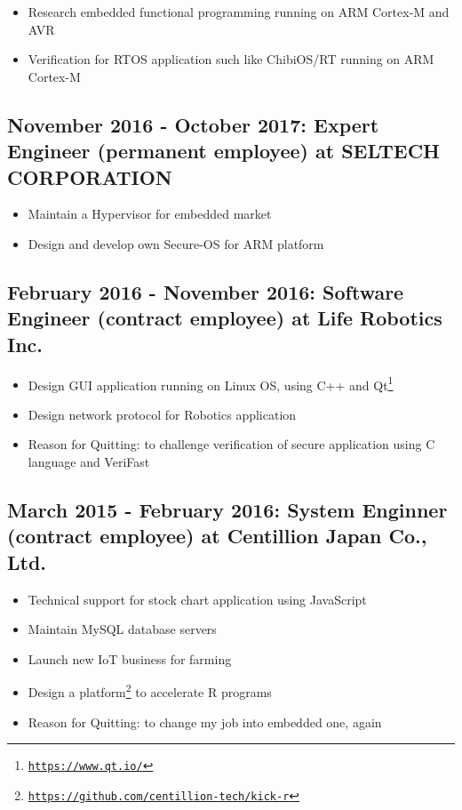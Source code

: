 \documentclass[letterpaper]{article}
\begin{document}
\begin{itemize}
  \item Research embedded functional programming running on ARM Cortex-M and AVR
  \item Verification for RTOS application such like ChibiOS/RT running on ARM Cortex-M
\end{itemize}

\subsection*{November 2016 - October 2017: Expert Engineer (permanent employee) at SELTECH CORPORATION}

\begin{itemize}
  \item Maintain a Hypervisor for embedded market
  \item Design and develop own Secure-OS for ARM platform
\end{itemize}

\subsection*{February 2016 - November 2016: Software Engineer (contract employee) at Life Robotics Inc.}

\begin{itemize}
  \item Design GUI application running on Linux OS, using C++ and Qt\footnote{\href{https://www.qt.io/}{\tt https://www.qt.io/}}
  \item Design network protocol for Robotics application
  \item Reason for Quitting: to challenge verification of secure application using C language and VeriFast
\end{itemize}

\subsection*{March 2015 - February 2016: System Enginner (contract employee) at Centillion Japan Co., Ltd.}

\begin{itemize}
  \item Technical support for stock chart application using JavaScript
  \item Maintain MySQL database servers
  \item Launch new IoT business for farming
  \item Design a platform\footnote{\href{https://github.com/centillion-tech/kick-r}{\tt https://github.com/centillion-tech/kick-r}} to accelerate R programs
  \item Reason for Quitting: to change my job into embedded one, again
\end{itemize}
\end{document}
